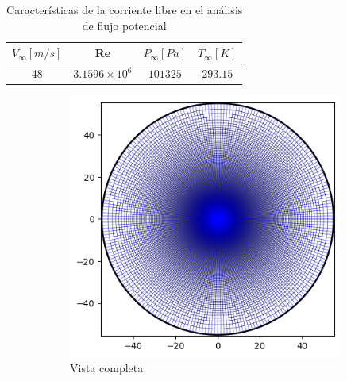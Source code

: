 \documentclass[letterpaper, openright, 12pt]{book}
\begin{document}
    \begin{table}[htbp!]
    \begin{center}
        \begin{tabular}{| c | c | c | c |}
        \hline
          $V_{\infty} [m / s]$ & Re & $P_{\infty} [Pa]$ & $T_{\infty} [K]$ \\
        \hline
          48 & $3.1596\times 10^{6}$ & $101 325$ & $293.15$ \\
        \hline
        \end{tabular}
        \caption{Características de la corriente libre en el análisis de flujo
            potencial}
    \label{tabla_potencial}
    \end{center}
    \end{table}

    \begin{figure}[htbp!]
        \centering
        \begin{subfigure}[c]{0.48\textwidth}
            \includegraphics[keepaspectratio, width=0.99\textwidth]
                {./img/potential_flow_mesh_far}
            \caption{Vista completa}
            \label{fig:potential_flow_mesh_far}
        \end{subfigure}
        \hfill
        \begin{subfigure}[c]{0.48\textwidth}

\end{subfigure}
\end{figure}
\end{document}
